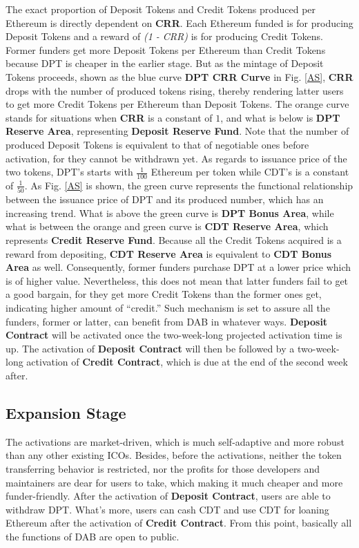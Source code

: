 \documentclass[review]{elsarticle}
\begin{document}
The exact proportion of Deposit Tokens and Credit Tokens produced per Ethereum is directly dependent on \textbf{CRR}. Each Ethereum funded is for producing Deposit Tokens and a reward of \emph{(1 - CRR)} is for producing Credit Tokens. Former funders get more Deposit Tokens per Ethereum than Credit Tokens because DPT is cheaper in the earlier stage. But as the mintage of Deposit Tokens proceeds, shown as the blue curve \textbf{DPT CRR Curve} in Fig. \ref{AS}, \textbf{CRR} drops with the number of produced tokens rising, thereby rendering latter users to get more Credit Tokens per Ethereum than Deposit Tokens. The orange curve stands for situations when \textbf{CRR} is a constant of $1$, and what is below is \textbf{DPT Reserve Area}, representing \textbf{Deposit Reserve Fund}. Note that the number of produced Deposit Tokens is equivalent to that of negotiable ones before activation, for they cannot be withdrawn yet.
As regards to issuance price of the two tokens, DPT's starts with ${\frac{1}{100}}$ Ethereum per token while CDT's is a constant of ${\frac{1}{50}}$. As Fig. \ref{AS} is shown, the green curve represents the functional relationship between the issuance price of DPT and its produced number, which has an increasing trend. What is above the green curve is \textbf{DPT Bonus Area}, while what is between the orange and green curve is \textbf{CDT Reserve Area}, which represents \textbf{Credit Reserve Fund}. Because all the Credit Tokens acquired is a reward from depositing, \textbf{CDT Reserve Area} is equivalent to \textbf{CDT Bonus Area}  as well. Consequently, former funders purchase DPT at a lower price which is of higher value.
Nevertheless, this does not mean that latter funders fail to get a good bargain, for they get more Credit Tokens than the former ones get, indicating higher amount of ``credit.'' Such mechanism is set to assure all the funders, former or latter, can benefit from DAB in whatever ways.
\textbf{Deposit Contract} will be activated once the two-week-long projected activation time is up. The activation of \textbf{Deposit Contract} will then be followed by a two-week-long activation of \textbf{Credit Contract}, which is due at the end of the second week after.

\subsection{Expansion Stage}
The activations are market-driven, which is much self-adaptive and more robust than any other existing ICOs. Besides, before the activations, neither the token transferring behavior is restricted, nor the profits for those developers and maintainers are dear for users to take, which making it much cheaper and more funder-friendly.
After the activation of \textbf{Deposit Contract}, users are able to withdraw DPT. What's more, users can cash CDT and use CDT for loaning Ethereum after the activation of \textbf{Credit Contract}. From this point, basically all the functions of DAB are open to public.
\end{document}

